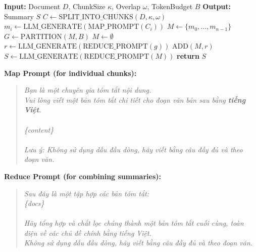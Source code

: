 \documentclass[11pt]{article}
\begin{document}
 
\begin{algorithm}
\caption{Map–Reduce Summarisation}
\label{alg:mapreduce}
\begin{algorithmic}[1]
\State \textbf{Input:} Document $D$, ChunkSize $\kappa$, Overlap $\omega$, TokenBudget $B$
\State \textbf{Output:} Summary $S$
\Statex {}
\State $C \gets \text{SPLIT\_INTO\_CHUNKS}(D, \kappa, \omega)$ 
    \State $m_i \gets \text{LLM\_GENERATE}(\text{MAP\_PROMPT}(C_i))$ 
\EndFor
\State $M \gets \{m_0, \dots, m_{n-1}\}$ 
\Statex {}
    \State $G \gets \text{PARTITION}(M, B)$ 
    \State $M \gets \emptyset$
        \State $r \gets \text{LLM\_GENERATE}(\text{REDUCE\_PROMPT}(g))$
        \State $\text{ADD}(M, r)$ 
    \EndFor
\EndWhile
\State $S \gets \text{LLM\_GENERATE}(\text{REDUCE\_PROMPT}(M))$ 
\State \textbf{return} $S$
\end{algorithmic}
\end{algorithm}

\textbf{Map Prompt (for individual chunks):}

\begin{quote}
\textit{Bạn là một chuyên gia tóm tắt nội dung.\\
Vui lòng viết một bản tóm tắt chi tiết cho đoạn văn bản sau bằng \textbf{tiếng Việt}.\\
\\
\{content\}\\
\\
Lưu ý: Không sử dụng dấu đầu dòng, hãy viết bằng câu đầy đủ và theo đoạn văn.}
\end{quote}

\textbf{Reduce Prompt (for combining summaries):}

\begin{quote}
\textit{Sau đây là một tập hợp các bản tóm tắt:\\
\{docs\}\\
\\
Hãy tổng hợp và chắt lọc chúng thành một bản tóm tắt cuối cùng, toàn diện về các chủ đề chính bằng tiếng Việt.\\
Không sử dụng dấu đầu dòng, hãy viết bằng câu đầy đủ và theo đoạn văn.}
\end{quote}
\end{document}
